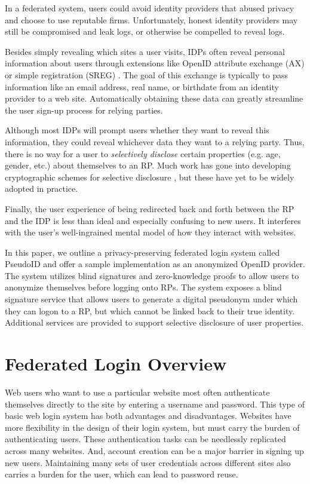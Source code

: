 \documentclass{llncs}
\begin{document}
In a federated system, users could avoid identity providers
that abused privacy and choose to use reputable firms. Unfortunately,
honest identity providers may still be compromised and leak logs, or
otherwise be compelled to reveal logs.

Besides simply revealing which sites a user visits, IDPs often reveal
personal information about users through extensions like OpenID
attribute exchange (AX) \cite{AX} or simple registration (SREG)
\cite{Sreg}. The goal of this exchange is typically to pass
information like an email address, real name, or birthdate from an
identity provider to a web site. Automatically obtaining these data
can greatly streamline the user sign-up process for relying parties.

Although most IDPs will prompt users whether they want to reveal this
information, they could reveal whichever data they want to a relying
party. Thus, there is no way for a user to \emph{selectively disclose}
certain properties (e.g. age, gender, etc.) about themselves to an
RP. Much work has gone into developing cryptographic schemes for
selective disclosure \cite{CaLy01,CaLy04,CHL05,CaGr08}, but these have
yet to be widely adopted in practice.

Finally, the user experience of being redirected back and forth
between the RP and the IDP is less than ideal and especially confusing
to new users. It interferes with the user's well-ingrained mental
model of how they interact with websites.

In this paper, we outline a privacy-preserving federated login system
called PseudoID and offer a sample implementation as an anonymized
OpenID provider. The system utilizes blind signatures \cite{Cha82} and
zero-knowledge proofs \cite{GMR89} to allow users to anonymize
themselves before logging onto RPs. The system exposes a blind
signature service that allows users to generate a digital pseudonym
under which they can logon to a RP, but which cannot be linked back to
their true identity. Additional services are provided to support
selective disclosure of user properties.

\section{Federated Login Overview}
\label{sec:fedlogin}

Web users who want to use a particular website most often authenticate
themselves directly to the site by entering a username and
password. This type of basic web login system has both advantages and
disadvantages. Websites have more flexibility in the design of their
login system, but must carry the burden of authenticating users. These
authentication tasks can be needlessly replicated across many
websites. And, account creation can be a major barrier in signing up new
users. Maintaining many sets of user credentials across different sites also
carries a burden for the user, which can lead to password reuse.
\end{document}
